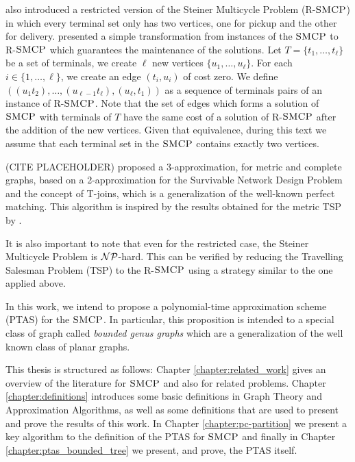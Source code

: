 \citeauthor{Pereira2018TheSM} also introduced a restricted version of the Steiner Multicycle Problem (R-\(\textsc{SMCP}\)) in which every terminal set only has two vertices, one for pickup and the other for delivery. \cite{LINTZMAYER2020134} presented a simple transformation from instances of the \(\textsc{SMCP}\) to R-\(\textsc{SMCP}\) which guarantees the maintenance of the solutions. Let \(T = \{t_1, \dots, t_\ell\}\) be a set of terminals, we create \(\ell\) new vertices \(\{u_1, \dots, u_\ell\}\). For each \(i \in \{1, \ldots, \ell\}\), we create an edge \((t_i, u_i)\) of cost zero. We define \(((u_1 t_2), \dots, (u_{\ell-1} t_\ell), (u_\ell, t_1))\) as a sequence of terminals pairs of an instance of R-\(\textsc{SMCP}\). Note that the set of edges which forms a solution of \(\textsc{SMCP}\) with terminals of \(T\) have the same cost of a solution of R-\(\textsc{SMCP}\) after the addition of the new vertices. Given that equivalence, during this text we assume that each terminal set in the \(\textsc{SMCP}\) contains exactly two vertices.

(CITE PLACEHOLDER) proposed a 3-approximation, for metric and complete graphs, based on a 2-approximation for the Survivable Network Design Problem and the concept of T-joins, which is a generalization of the well-known perfect matching. This algorithm is inspired by the results obtained for the metric TSP by \cite{Christofides2022WorstCaseAO}.

It is also important to note that even for the restricted case, the Steiner Multicycle Problem is \(\mathcal{NP}\)-hard. This can be verified by reducing the Travelling Salesman Problem (TSP) to the R-\(\textsc{SMCP}\) using a strategy similar to the one applied above.

In this work, we intend to propose a polynomial-time approximation scheme (PTAS) for the \(\textsc{SMCP}\). In particular, this proposition is intended to a special class of graph called \textit{bounded genus graphs} which are a generalization of the well known class of planar graphs.

This thesis is structured as follows: Chapter \ref{chapter:related_work} gives an overview of the literature for \(\textsc{SMCP}\) and also for related problems. Chapter \ref{chapter:definitions} introduces some basic definitions in Graph Theory and Approximation Algorithms, as well as some definitions that are used to present and prove the results of this work. In Chapter \ref{chapter:pc-partition} we present a key algorithm to the definition of the PTAS for \(\textsc{SMCP}\) and finally in Chapter \ref{chapter:ptas_bounded_tree} we present, and prove, the PTAS itself.